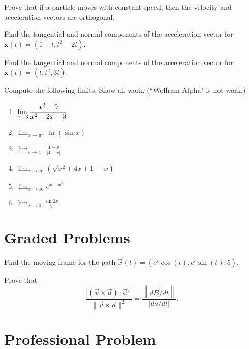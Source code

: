 \documentclass{ximera}
\begin{document}
\begin{problem}
Prove that if a particle moves with constant speed, then the velocity and acceleration vectors are orthogonal.
\end{problem}

\begin{problem}
Find the tangential and normal components of the acceleration vector for $\mathbf{x}(t)=(1+t,t^{2}-2t)$.
\end{problem}

\begin{problem}
Find the tangential and normal components of the acceleration vector for $\mathbf{x}(t)=(t, t^{2}, 3t)$.
\end{problem}

\begin{problem}
Compute the following limits. Show all work. (``Wolfram Alpha" is not work.)
\begin{enumerate}
\item $\displaystyle \lim_{x\to 3} \cfrac{x^2-9}{x^2+2x-3}$
\item $\displaystyle \lim_{x\to \pi^-} \ln(\sin{x})$
\item $\displaystyle \lim_{v\to 4^+} \frac{4-v}{|4-v|}$
\item $\displaystyle \lim_{x\to \infty} (\sqrt{x^2+4x+1} - x)$ 
\item $\displaystyle \lim_{x\to \infty} e^{x-x^2}$
\item $\displaystyle \lim_{x\to 0} \frac{\sin{2x}}{x}$ 
\end{enumerate}
\end{problem}

\section*{Graded Problems}

\begin{problem}
Find the moving frame for the path $\vec{x}(t) = (e^t\cos(t), e^t\sin(t), 5)$.
\end{problem}

\begin{problem}
Prove that 
\[\frac{|(\vec{v}\times\vec{a})\cdot \vec{a}'|}{\|\vec{v}\times\vec{a}\|^2} = \frac{\left\|d\vec{B}/dt\right\|}{|ds/dt|}.\]
\end{problem}

\section*{Professional Problem}
\end{document}
